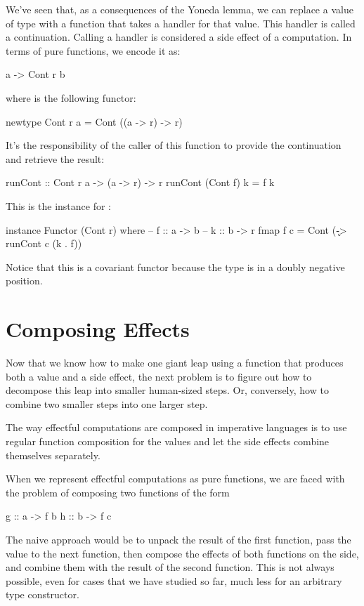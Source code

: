 \documentclass[DaoFP]{subfiles}
\begin{document}
We've seen that, as a consequences of the Yoneda lemma, we can replace a value of type  with a function that takes a handler for that value. This handler is called a continuation. Calling a handler is considered a side effect of a computation. In terms of pure functions, we encode it as:
\begin{haskell}
a -> Cont r b
\end{haskell}
where  is the following functor:
\begin{haskell}
newtype Cont r a = Cont ((a -> r) -> r)
\end{haskell}
It's the responsibility of the caller of this function to provide the continuation and retrieve the result:
\begin{haskell}
runCont :: Cont r a -> (a -> r) -> r
runCont (Cont f) k = f k
\end{haskell}

This is the  instance for :
\begin{haskell}
instance Functor (Cont r) where
  -- f :: a -> b
  -- k :: b -> r
  fmap f c = Cont (\k -> runCont c (k . f))
\end{haskell}
Notice that this is a covariant functor because the type  is in a doubly negative position.

\section{Composing Effects}

Now that we know how to make one giant leap using a function that produces both a value and a side effect, the next problem is to figure out how to decompose this leap into smaller human-sized steps. Or, conversely, how to combine two smaller steps into one larger step. 

The way effectful computations are composed in imperative languages is to use regular function composition for the values and let the side effects combine themselves separately. 

When we represent effectful computations as pure functions, we are faced with the problem of composing two functions of the form
\begin{haskell}
g :: a -> f b
h :: b -> f c
\end{haskell}

The naive approach would be to unpack the result of the first function, pass the value to the next function, then compose the effects of both functions on the side, and combine them with the result of the second function. This is not always possible, even for cases that we have studied so far, much less for an arbitrary type constructor.
\end{document}
